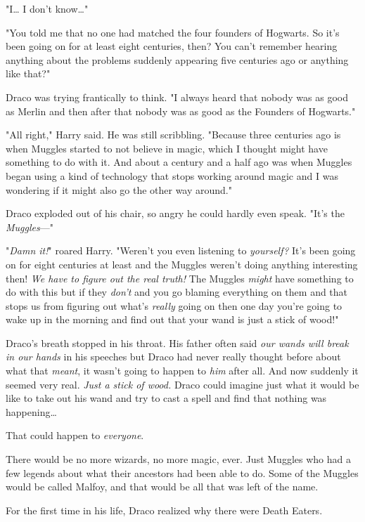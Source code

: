 "I{\ldots} I don't know{\ldots}"

"You told me that no one had matched the four founders of Hogwarts. So it's
been going on for at least eight centuries, then? You can't remember hearing
anything about the problems suddenly appearing five centuries ago or anything
like that?"

Draco was trying frantically to think. "I always heard that nobody was as good
as Merlin and then after that nobody was as good as the Founders of Hogwarts."

"All right," Harry said. He was still scribbling. "Because three centuries ago
is when Muggles started to not believe in magic, which I thought might have
something to do with it. And about a century and a half ago was when Muggles
began using a kind of technology that stops working around magic and I was
wondering if it might also go the other way around."

Draco exploded out of his chair, so angry he could hardly even speak. "It's the
\emph{Muggles}---"

"\emph{Damn it!}" roared Harry. "Weren't you even listening to \emph{yourself?}
It's been going on for eight centuries at least and the Muggles weren't doing
anything interesting then! \emph{We have to figure out the real truth!} The
Muggles \emph{might} have something to do with this but if they \emph{don't}
and you go blaming everything on them and that stops us from figuring out
what's \emph{really} going on then one day you're going to wake up in the
morning and find out that your wand is just a stick of wood!"

Draco's breath stopped in his throat. His father often said \emph{our wands
will break in our hands} in his speeches but Draco had never really thought
before about what that \emph{meant}, it wasn't going to happen to \emph{him}
after all. And now suddenly it seemed very real. \emph{Just a stick of wood.}
Draco could imagine just what it would be like to take out his wand and try to
cast a spell and find that nothing was happening{\ldots}

That could happen to \emph{everyone}.

There would be no more wizards, no more magic, ever. Just Muggles who had a few
legends about what their ancestors had been able to do. Some of the Muggles
would be called Malfoy, and that would be all that was left of the name.

For the first time in his life, Draco realized why there were Death Eaters.

